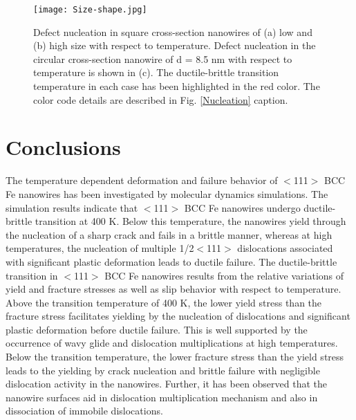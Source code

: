 \documentclass[%
reprint,%
 amssymb, amsmath,%
 aip,apl,%
]{revtex4-1}
\begin{document}
\begin{figure}
\centering
\texttt{[image: Size-shape.jpg]}
\caption {Defect nucleation in square cross-section nanowires of (a) low and (b) high size with respect to temperature. Defect 
nucleation in the circular cross-section nanowire of d = 8.5 nm with respect to temperature is shown in (c). The ductile-brittle 
transition temperature in each case has been highlighted in the red color. The color code details are described in Fig. 
\ref{Nucleation} caption.}
\label{Size-shape}
\end{figure}

\section{Conclusions}
The temperature dependent deformation and failure behavior of $<$111$>$ BCC Fe nanowires has been investigated by molecular dynamics 
simulations. The simulation results indicate that $<$111$>$ BCC Fe nanowires undergo ductile-brittle transition at 400 K. Below this 
temperature, the nanowires yield through the nucleation of a sharp crack and fails in a brittle manner, whereas at high temperatures, 
the nucleation of multiple 1/2$<$111$>$ dislocations associated with significant plastic deformation leads to ductile failure. The 
ductile-brittle transition in $<$111$>$ BCC Fe nanowires results from the relative variations of yield and fracture stresses as well 
as slip behavior with respect to temperature. Above the transition temperature of 400 K, the lower yield stress than the fracture 
stress facilitates yielding by the nucleation of dislocations and significant plastic deformation before ductile failure. This is well 
supported by the occurrence of wavy glide and dislocation multiplications at high temperatures. Below the transition temperature, the 
lower fracture stress than the yield stress leads to the yielding by crack nucleation and brittle failure with negligible dislocation 
activity in the nanowires. Further, it has been observed that the nanowire surfaces aid in dislocation multiplication mechanism and
also in dissociation of immobile dislocations.\\
\end{document}
